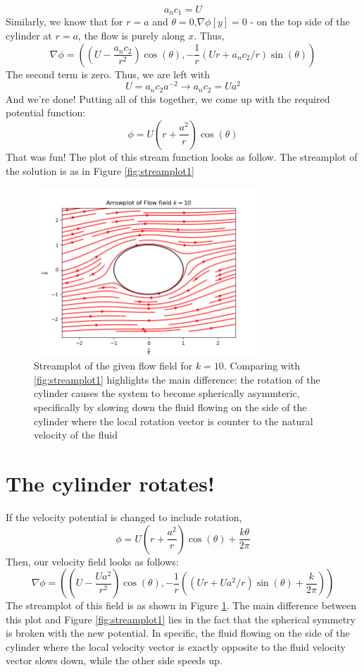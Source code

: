 \documentclass[english]{article}
\begin{document}
$$ a_nc_{1} = U$$
Similarly, we know that for $r=a$ and $\theta=0$,$\nabla\phi[y]=0$ - on the top
side of the cylinder at $r=a$, the flow is purely along $x$.
Thus,
$$ \nabla\phi = ((U-\frac{a_nc_{2}}{r^{2}})\cos(\theta),
	-\frac{1}{r}(Ur+a_nc_{2}/r)\sin(\theta))
$$
The second term is zero. 
Thus, we are left with
$$ U = a_nc_{2}a^{-2} \rightarrow a_nc_{2} = Ua^{2} $$
And we're done! Putting all of this together, we come up with the required
potential function:
$$ \phi = U\left(r+\frac{a^{2}}{r}\right)\cos(\theta)$$
That was fun! The plot of this stream function looks as follow. 
The streamplot of the solution is as in Figure \ref{fig:streamplot1}
\begin{figure}
	\centering
	\includegraphics[width=0.75\textwidth]{arrowplotp3.png}
	\caption{Streamplot of the given flow field for $k=10$. 
	Comparing with \ref{fig:streamplot1} highlights the main difference: the
	rotation of the cylinder causes the system to become spherically asymmteric,
	specifically by slowing down the fluid flowing on the side of the cylinder
	where the local rotation vector is counter to the natural velocity of the fluid}
	\label{fig:streamplot2}
\end{figure}

\section{The cylinder rotates!}
If the velocity potential is changed to include rotation, 
$$  \phi = U\left(r+\frac{a^{2}}{r}\right)\cos(\theta) + \frac{k\theta}{2\pi}$$
Then, our velocity field looks as follows:
$$ \nabla\phi = ((U-\frac{Ua^{2}}{r^{2}})\cos(\theta),
	-\frac{1}{r}((Ur+Ua^{2}/r)\sin(\theta)+\frac{k}{2\pi}))
$$
The streamplot of this field is as shown in Figure \ref{fig:streamplot2}.
The main difference between this plot and Figure \ref{fig:streamplot1} lies
in the fact that the spherical symmetry is broken with the new potential.
In specific, the fluid flowing on the side of the cylinder where the local
velocity vector is exactly opposite to the fluid velocity vector slows down,
while the other side speeds up.
\end{document}
